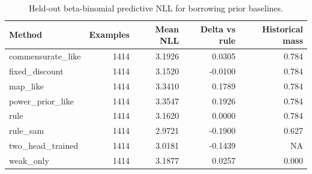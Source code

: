 \begin{table}[htbp]
\centering
\small
\caption{Held-out beta-binomial predictive NLL for borrowing prior baselines.}
\label{tab:borrowing-baselines}
\begin{tabular}{lrrrr}
\toprule
Method & Examples & Mean NLL & Delta vs rule & Historical mass \\
\midrule
commensurate\_like & 1414 & 3.1926 & 0.0305 & 0.784 \\
fixed\_discount & 1414 & 3.1520 & -0.0100 & 0.784 \\
map\_like & 1414 & 3.3410 & 0.1789 & 0.784 \\
power\_prior\_like & 1414 & 3.3547 & 0.1926 & 0.784 \\
rule & 1414 & 3.1620 & 0.0000 & 0.784 \\
rule\_sam & 1414 & 2.9721 & -0.1900 & 0.627 \\
two\_head\_trained & 1414 & 3.0181 & -0.1439 & NA \\
weak\_only & 1414 & 3.1877 & 0.0257 & 0.000 \\
\bottomrule
\end{tabular}
\end{table}
